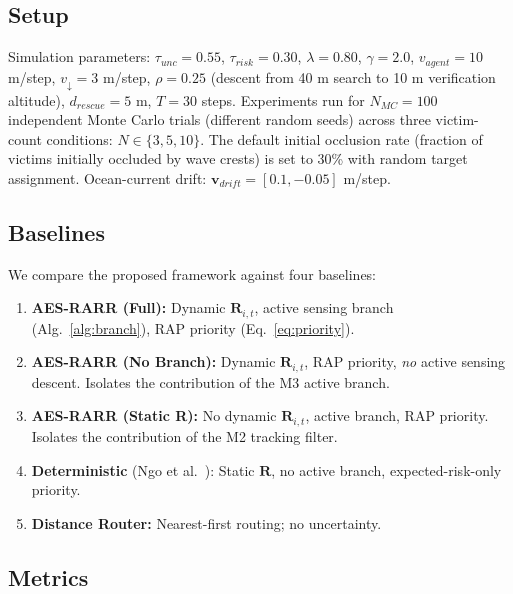 \documentclass[11pt,a4paper]{article}
\begin{document}
\subsection{Setup}
\label{sec:setup}

Simulation parameters: $\tau_{unc} = 0.55$, $\tau_{risk} = 0.30$, $\lambda = 0.80$,
$\gamma = 2.0$, $v_{agent} = 10$ m/step, $v_\downarrow = 3$ m/step,
$\rho = 0.25$ (descent from 40 m search to 10 m verification altitude),
$d_{rescue} = 5$ m, $T = 30$ steps.
Experiments run for $N_{MC} = 100$ independent Monte Carlo trials
(different random seeds) across three victim-count conditions:
$N \in \{3, 5, 10\}$.
The default initial occlusion rate (fraction of victims initially occluded by wave crests) is set to 30\% with random target assignment.
Ocean-current drift: $\boldsymbol{v}_{drift} = [0.1, -0.05]$ m/step.

\subsection{Baselines}

We compare the proposed framework against four baselines:
\begin{enumerate}
  \item \textbf{AES-RARR (Full):} Dynamic $\mathbf{R}_{i,t}$,
        active sensing branch (Alg.~\ref{alg:branch}), RAP priority
        (Eq.~\ref{eq:priority}).
  \item \textbf{AES-RARR (No Branch):} Dynamic $\mathbf{R}_{i,t}$,
        RAP priority, \emph{no} active sensing descent.
        Isolates the contribution of the M3 active branch.
  \item \textbf{AES-RARR (Static R):} No dynamic $\mathbf{R}_{i,t}$,
        active branch, RAP priority.
        Isolates the contribution of the M2 tracking filter.
  \item \textbf{Deterministic} (Ngo et al.\ \cite{ref4}): Static $\mathbf{R}$,
        no active branch, expected-risk-only priority.
  \item \textbf{Distance Router:} Nearest-first routing; no uncertainty.
\end{enumerate}

\subsection{Metrics}
\end{document}
